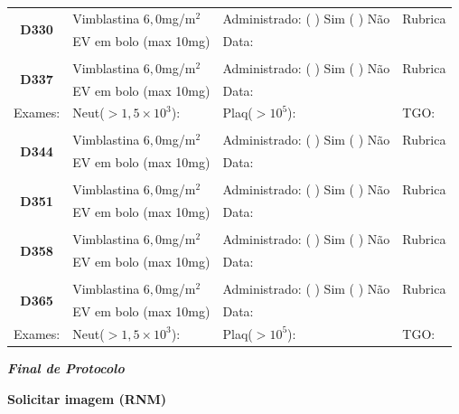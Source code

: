 \documentclass[11pt,a4paper,oldfontcommands]{memoir}
\begin{document}
\begin{center}
\begin{table}[H]
\begin{tabular}{p{}p{}|p{}|p{3cm}}
\end{tabular}
\end{table}
\clearpage
\begin{table}[H]
\begin{tabular}{p{}p{}|p{}|p{3cm}}
    \hline
    \multicolumn{1}{c|}{\multirow{2}{*}{\textbf{D330}}}&{Vimblastina \(6,0\)mg/m\(^2\)}&{Administrado: (  ) Sim (  ) Não}&{Rubrica}\\
    \multicolumn{1}{c|}{}&{EV em bolo (max 10mg)}&{Data:}&\\
    \hline
    \\
    \hline
    \multicolumn{1}{c|}{\multirow{2}{*}{\textbf{D337}}}&{Vimblastina \(6,0\)mg/m\(^2\)}&{Administrado: (  ) Sim (  ) Não}&{Rubrica}\\
    \multicolumn{1}{c|}{}&{EV em bolo (max 10mg)}&{Data:}&\\
    \hline
    {Exames:}&{Neut(\(>1,5\times10^3\)):}&{Plaq(\(>10^5\)):}&{TGO:}
    \\
    \hline
    \\
    \hline
    \multicolumn{1}{c|}{\multirow{2}{*}{\textbf{D344}}}&{Vimblastina \(6,0\)mg/m\(^2\)}&{Administrado: (  ) Sim (  ) Não}&{Rubrica}\\
    \multicolumn{1}{c|}{}&{EV em bolo (max 10mg)}&{Data:}&\\
    \hline
    \\
    \hline
    \multicolumn{1}{c|}{\multirow{2}{*}{\textbf{D351}}}&{Vimblastina \(6,0\)mg/m\(^2\)}&{Administrado: (  ) Sim (  ) Não}&{Rubrica}\\
    \multicolumn{1}{c|}{}&{EV em bolo (max 10mg)}&{Data:}&\\
    \hline
    \\
    \hline
    \multicolumn{1}{c|}{\multirow{2}{*}{\textbf{D358}}}&{Vimblastina \(6,0\)mg/m\(^2\)}&{Administrado: (  ) Sim (  ) Não}&{Rubrica}\\
    \multicolumn{1}{c|}{}&{EV em bolo (max 10mg)}&{Data:}&\\
    \hline
    \\
    \hline
    \multicolumn{1}{c|}{\multirow{2}{*}{\textbf{D365}}}&{Vimblastina \(6,0\)mg/m\(^2\)}&{Administrado: (  ) Sim (  ) Não}&{Rubrica}\\
    \multicolumn{1}{c|}{}&{EV em bolo (max 10mg)}&{Data:}&\\
    \hline
    {Exames:}&{Neut(\(>1,5\times10^3\)):}&{Plaq(\(>10^5\)):}&{TGO:}
    \\
   \hline
\end{tabular}
\end{table}
\textbf{\textit{Final de Protocolo}}

\textbf{Solicitar imagem (RNM)}
\end{center}
\end{document}

